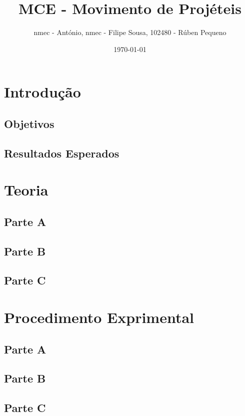 \documentclass{report}
\title{MCE - Movimento de Projéteis}
\author{nmec - António, nmec - Filipe Sousa, 102480 - Rúben Pequeno}
\date{\today}
\begin{document}
\maketitle

\tableofcontents
\newpage

\chapter{Introdução}

\section{Objetivos}

\section{Resultados Esperados}

\chapter{Teoria}

\section{Parte A}

\section{Parte B}

\section{Parte C}

\chapter{Procedimento Exprimental}

\section{Parte A}

\section{Parte B}

\section{Parte C}
\end{document}
